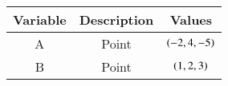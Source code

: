 \begin{tabular}[12pt]{|c|c|c|}
\hline
\textbf{Variable} & \textbf{Description} & \textbf{Values}\\
\hline
A & Point & $\left(-2,4,-5\right)$\\
\hline
B & Point & $\left(1,2,3\right)$\\
\hline
\end{tabular}